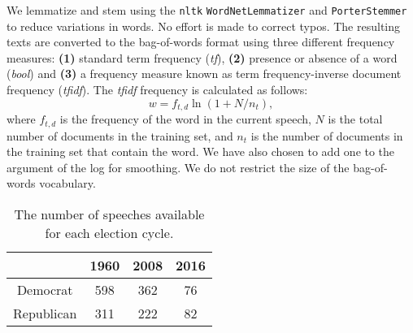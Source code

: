 \documentclass[aps, prl, reprint, showpacs]{revtex4-1}
\begin{document}
We lemmatize and stem using the \texttt{nltk} \texttt{WordNetLemmatizer} and \texttt{PorterStemmer} to reduce variations in words. No effort is made to correct typos. The resulting texts are converted to the bag-of-words format using three different frequency measures: \textbf{(1)} standard term frequency (\textit{tf}), \textbf{(2)} presence or absence of a word (\textit{bool}) and \textbf{(3)} a frequency measure known as term frequency-inverse document frequency (\textit{tfidf}). The \textit{tfidf} frequency is calculated as follows:
\begin{equation}
    w = f_{t,d} \ln (1 + N/n_t),
\end{equation}
where $f_{t,d}$ is the frequency of the word in the current speech, $N$ is the total number of documents in the training set, and $n_t$ is the number of documents in the training set that contain the word. We have also chosen to add one to the argument of the log for smoothing. We do not restrict the size of the bag-of-words vocabulary.

\begin{table}[h] %
  \label{tab:data}
  \begin{ruledtabular}
  \begin{tabular}{cccc}
   & 1960 & 2008 & 2016 \\
 \hline
    Democrat & 598 & 362  & 76  \\
    Republican & 311 & 222  & 82  \\

 \hline
  \end{tabular}
  \end{ruledtabular}
    \caption{The number of speeches available for each election cycle.}
\end{table}

\end{document}
